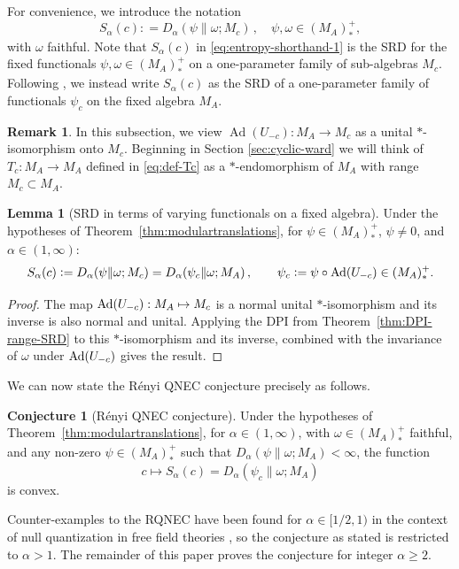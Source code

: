 \documentclass[11pt,a4paper]{article}
\theoremstyle{plain}
\numberwithin{theorem}{section}
\theoremstyle{definition}
\newtheorem{remark}[theorem]{Remark}
\newtheorem{lemma}[theorem]{Lemma}
\newtheorem{conjecture}[theorem]{Conjecture}
\newcommand{\?}{\overset{?}{=}}
\newcommand{\defeq}{\mathrel{\mathop:}=}
\DeclareMathOperator{\Ad}{Ad}
\newcommand{\I}{\infty}
\renewcommand{\a}{\alpha}	%
\begin{document}
For convenience, we introduce the notation
\begin{equation}			\label{eq:entropy-shorthand-1}
	S_\a(c)\defeq D_\a(\psi\|\omega;M_c)\,, \quad \psi, \omega\in (M_A)_*^+,
\end{equation}
with $\omega$ faithful.
Note that $S_\a(c)$ in \eqref{eq:entropy-shorthand-1} is the SRD for the fixed functionals $\psi,\omega \in  (M_A)_*^+$ on a one-parameter family of sub-algebras $M_c$. Following \cite{Hollands:2025glm}, we instead write $S_{\a}(c)$ as the SRD of a one-parameter family of functionals $\psi_c$ on the fixed algebra $M_A$. 
\begin{remark}
In this subsection, we view $\Ad(U_{-c}):M_A\to M_c$ as a unital $*$-isomorphism onto $M_c$. Beginning in Section \ref{sec:cyclic-ward} we will think of $T_c:M_A\to M_A$ defined in \eqref{eq:def-Tc} as a $*$-endomorphism of $M_A$ with range $M_c\subset M_A$.
\end{remark}

\begin{lemma}[SRD in terms of varying functionals on a fixed algebra]\label{lem:fixedalgebraSRD}
Under the hypotheses of Theorem~\ref{thm:modulartranslations}, for $\psi \in (M_A)_*^+$, $\psi\neq0$, and $\alpha\in (1,\I)$:
\begin{equation}
    S_\a(c)\defeq D_\a(\psi\|\omega;M_c)= D_\a(\psi_c\|\omega;M_A)\,,\qquad \psi_c\defeq \psi \circ {\rm Ad}(U_{-c})\in (M_A)_*^+.
\end{equation}
\end{lemma}
\begin{proof}
The map ${\rm Ad}(U_{-c}): M_A \mapsto M_c$ is a normal unital $*$-isomorphism and its inverse is also normal and unital. Applying the DPI from Theorem~\ref{thm:DPI-range-SRD} to this $*$-isomorphism and its inverse, combined with the invariance of $\omega$ under ${\rm Ad}(U_{-c})$ gives the result.
\end{proof}


We can now state the R\'{e}nyi QNEC conjecture precisely as follows.
\begin{conjecture}[R\'{e}nyi QNEC conjecture]\label{conj:RQNEC}
Under the hypotheses of Theorem~\ref{thm:modulartranslations}, for $\alpha\in (1,\I)$, with $\omega\in(M_A)_*^+$ faithful, and any non-zero $\psi\in (M_A)_*^+$ such that $D_\a(\psi\|\omega;M_A)<\I$, the function
\[
c\mapsto S_\a(c)= D_\a(\psi_c\|\omega;M_A)
\]
is convex.
\end{conjecture}
Counter-examples to the RQNEC have been found for $\a\in [1/2,1)$ in the context of null quantization in free field theories \cite{Moosa:2020jwt}, so the conjecture as stated is restricted to $\alpha>1$. The remainder of this paper proves the conjecture for integer $\a\geq2$.
\end{document}
